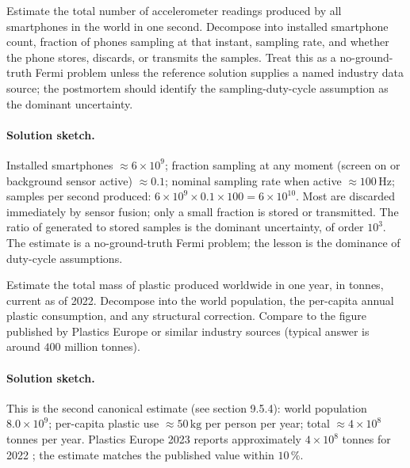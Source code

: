 \begin{exercise}
Estimate the total number of accelerometer readings produced by all
smartphones in the world in one second. Decompose into installed
smartphone count, fraction of phones sampling at that instant,
sampling rate, and whether the phone stores, discards, or transmits
the samples. Treat this as a no-ground-truth Fermi problem unless
the reference solution supplies a named industry data source; the
postmortem should identify the sampling-duty-cycle assumption as
the dominant uncertainty.
\end{exercise}

\paragraph{Solution sketch.}
Installed smartphones $\approx 6 \times 10^{9}$; fraction sampling
at any moment (screen on or background sensor active) $\approx
0.1$; nominal sampling rate when active $\approx 100 \,\si{\hertz}$;
samples per second produced: $6 \times 10^{9} \times 0.1 \times
100 = 6 \times 10^{10}$. Most are discarded immediately by sensor
fusion; only a small fraction is stored or transmitted. The
ratio of generated to stored samples is the dominant uncertainty,
of order $10^{3}$. The estimate is a no-ground-truth Fermi
problem; the lesson is the dominance of duty-cycle assumptions.

\begin{exercise}
Estimate the total mass of plastic produced worldwide in one year,
in tonnes, current as of 2022. Decompose into the world population,
the per-capita annual plastic consumption, and any structural
correction. Compare to the figure published by Plastics Europe or
similar industry sources (typical answer is around $400$ million
tonnes).
\end{exercise}

\paragraph{Solution sketch.}
This is the second canonical estimate (see section 9.5.4): world
population $8.0 \times 10^{9}$; per-capita plastic use $\approx
50 \,\si{\kilo\gram}$ per person per year; total $\approx 4 \times
10^{8}$ tonnes per year. Plastics Europe 2023 reports approximately
$4 \times 10^{8}$ tonnes for 2022 \cite{data:ch09-plastics-europe-2023};
the estimate matches the published value within $10\,\%$.


